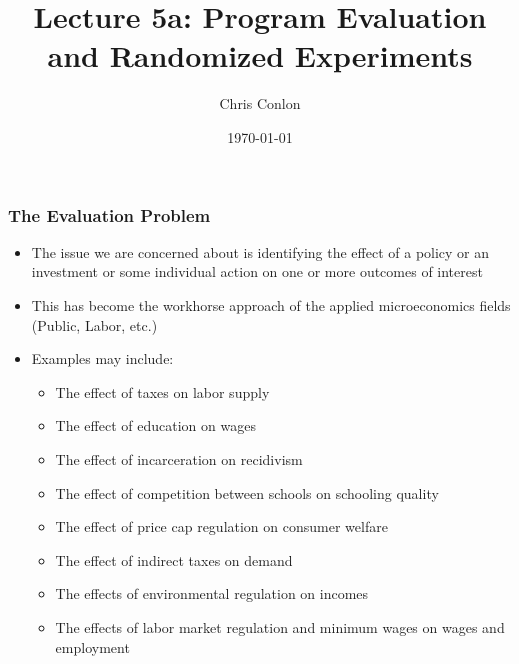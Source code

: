 \documentclass[aspectratio=169,11pt]{beamer}
\title{Lecture 5a: Program Evaluation and Randomized Experiments}
\author{Chris Conlon}
\institute{Applied Econometrics}
\date{\today}
\begin{document}
\frame{\titlepage}


\begin{frame}
\frametitle{The Evaluation Problem}
\begin{itemize}
\item The issue we are concerned about is identifying the effect of a policy or an investment or some individual action on one or more outcomes of interest
\item This has become the workhorse approach of the applied microeconomics fields (Public, Labor, etc.)
\item Examples may include:
\begin{itemize}
\item The effect of taxes on labor supply
\item The effect of education on wages
\item The effect of incarceration on recidivism
\item The effect of competition between schools on schooling quality
\item The effect of price cap regulation on consumer welfare
\item The effect of indirect taxes on demand
\item The effects of environmental regulation on incomes
\item The effects of labor market regulation and minimum wages on wages and employment
\end{itemize}
\end{itemize}
\end{frame}
\end{document}
